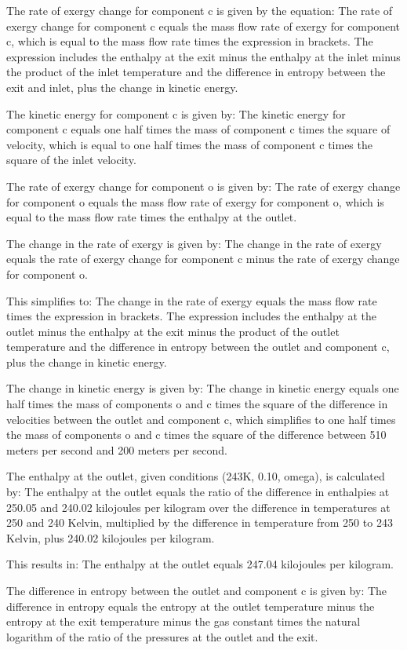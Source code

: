 The rate of exergy change for component c is given by the equation:
The rate of exergy change for component c equals the mass flow rate of exergy for component c, which is equal to the mass flow rate times the expression in brackets. The expression includes the enthalpy at the exit minus the enthalpy at the inlet minus the product of the inlet temperature and the difference in entropy between the exit and inlet, plus the change in kinetic energy.

The kinetic energy for component c is given by:
The kinetic energy for component c equals one half times the mass of component c times the square of velocity, which is equal to one half times the mass of component c times the square of the inlet velocity.

The rate of exergy change for component o is given by:
The rate of exergy change for component o equals the mass flow rate of exergy for component o, which is equal to the mass flow rate times the enthalpy at the outlet.

The change in the rate of exergy is given by:
The change in the rate of exergy equals the rate of exergy change for component c minus the rate of exergy change for component o.

This simplifies to:
The change in the rate of exergy equals the mass flow rate times the expression in brackets. The expression includes the enthalpy at the outlet minus the enthalpy at the exit minus the product of the outlet temperature and the difference in entropy between the outlet and component c, plus the change in kinetic energy.

The change in kinetic energy is given by:
The change in kinetic energy equals one half times the mass of components o and c times the square of the difference in velocities between the outlet and component c, which simplifies to one half times the mass of components o and c times the square of the difference between 510 meters per second and 200 meters per second.

The enthalpy at the outlet, given conditions (243K, 0.10, omega), is calculated by:
The enthalpy at the outlet equals the ratio of the difference in enthalpies at 250.05 and 240.02 kilojoules per kilogram over the difference in temperatures at 250 and 240 Kelvin, multiplied by the difference in temperature from 250 to 243 Kelvin, plus 240.02 kilojoules per kilogram.

This results in:
The enthalpy at the outlet equals 247.04 kilojoules per kilogram.

The difference in entropy between the outlet and component c is given by:
The difference in entropy equals the entropy at the outlet temperature minus the entropy at the exit temperature minus the gas constant times the natural logarithm of the ratio of the pressures at the outlet and the exit.
